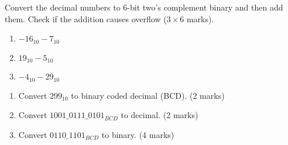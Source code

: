 \begin{prob}
  Convert the decimal numbers to 6-bit two's complement binary and then add
  them. Check if the addition causes overflow ($3 \times 6$ marks).
  \begin{enumerate}
  \item $-16_{10} - 7_{10}$
  \item $19_{10} - 5_{10}$
  \item $-4_{10} - 29_{10}$
  \end{enumerate}
\end{prob}

\vspace{20em}

\begin{prob}
  \begin{enumerate}
  \item Convert $299_{10}$  to binary coded decimal (BCD). (2 marks)
  \item {\color{red}Convert $1001\_ 0111\_ 0101_{BCD}$  to decimal.} (2 marks)
  \item Convert $0110\_ 1101_{BCD}$  to binary. (4 marks)
  \end{enumerate}
\end{prob}

\vspace{20em}
